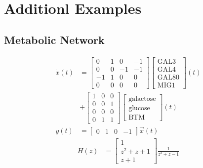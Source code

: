 \documentclass[9 pt]{article}
\newcommand{\1}{\mathbbm{1}}
\begin{document}
  \section*{Additionl Examples}

    \subsection*{Metabolic Network}
  \begin{align*}
    \dot{x}(t) &= \begin{bmatrix} 0 & 1 & 0 & -1 \\ 0 & 0 & -1 & -1 \\ -1 & 1 & 0 & 0 \\ 0 & 0 & 0 & 0 \end{bmatrix} \begin{bmatrix} \text{GAL3} \\ \text{GAL4} \\ \text{GAL80} \\ \text{MIG1} \end{bmatrix}(t) \\ &+ \begin{bmatrix} 1 & 0 & 0 \\ 0 & 0 & 1 \\ 0 & 0 & 0 \\ 0 & 1 & 1 \end{bmatrix} \begin{bmatrix} \text{galactose} \\ \text{glucose} \\ \text{BTM} \end{bmatrix}(t) \\
        y(t) &= \begin{bmatrix} 0 & 1 & 0 & -1 \end{bmatrix} \vec{x}(t)
    \end{align*}
    \begin{align*}
      H(z) &= \begin{bmatrix} 1 \\ z^{2} + z + 1 \\ z + 1 \end{bmatrix} \frac{1}{z^{3} + z -1}
    \end{align*}
\end{document}
